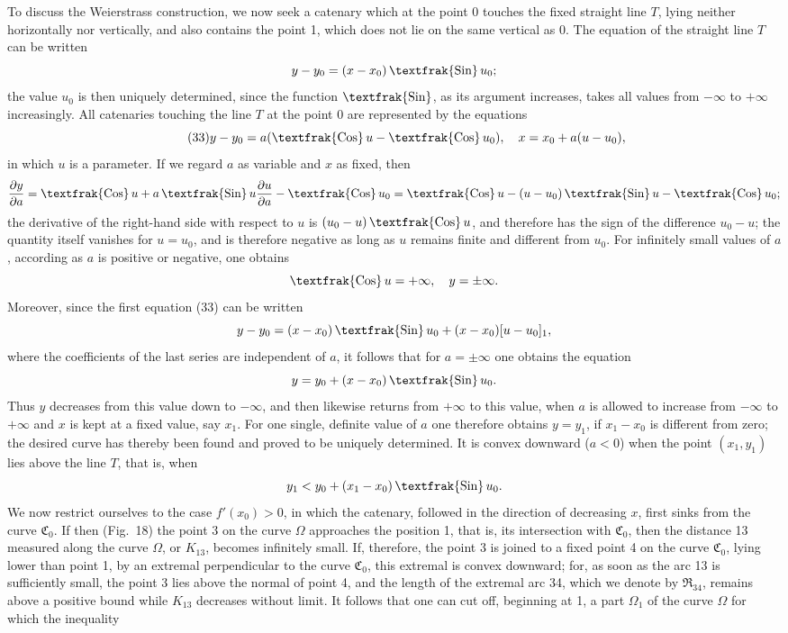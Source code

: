 \documentclass[11pt,a4paper,leqno]{article}
\newcommand{\Cof}{\mathop{\text{\textfrak{Cos}}}\nolimits}
\newcommand{\Sin}{\mathop{\text{\textfrak{Sin}}}\nolimits}
\begin{document}
To discuss the Weierstrass construction, we now seek a catenary which at the point 0 touches the fixed straight line $T$, lying neither horizontally nor vertically, and also contains the point 1, which does not lie on the same vertical as 0. The equation of the straight line $T$ can be written
\[
y-y_0=(x-x_0)\Sin u_0;
\]
the value $u_0$ is then uniquely determined, since the function $\Sin$, as its argument increases, takes all values from $-\infty$ to $+\infty$ increasingly. All catenaries touching the line $T$ at the point 0 are represented by the equations
\begin{equation}\tag{33}
y-y_0=a(\Cof u-\Cof u_0),\quad x=x_0+a(u-u_0),
\end{equation}
in which $u$ is a parameter. If we regard $a$ as variable and $x$ as fixed, then
\[
\frac{\partial y}{\partial a}=\Cof u+a\Sin u\frac{\partial u}{\partial a}-\Cof u_0
=\Cof u-(u-u_0)\Sin u-\Cof u_0;
\]
the derivative of the right-hand side with respect to $u$ is $(u_0-u)\Cof u$, and therefore has the sign of the difference $u_0-u$; the quantity itself vanishes for $u=u_0$, and is therefore negative as long as $u$ remains finite and different from $u_0$. For infinitely small values of $a$, according as $a$ is positive or negative, one obtains
\[
\Cof u=+\infty,\quad y=\pm\infty.
\]
Moreover, since the first equation (33) can be written
\[
y-y_0=(x-x_0)\Sin u_0+(x-x_0)[u-u_0]_1,
\]
where the coefficients of the last series are independent of $a$, it follows that for $a=\pm\infty$ one obtains the equation
\[
y=y_0+(x-x_0)\Sin u_0.
\]
Thus $y$ decreases from this value down to $-\infty$, and then likewise returns from $+\infty$ to this value, when $a$ is allowed to increase from $-\infty$ to $+\infty$ and $x$ is kept at a fixed value, say $x_1$. For one single, definite value of $a$ one therefore obtains $y=y_1$, if $x_1-x_0$ is different from zero; the desired curve has thereby been found and proved to be uniquely determined. It is convex downward ($a<0$) when the point $(x_1,y_1)$ lies above the line $T$, that is, when
\[
y_1<y_0+(x_1-x_0)\Sin u_0.
\]
We now restrict ourselves to the case $f'(x_0)>0$, in which the catenary, followed in the direction of decreasing $x$, first sinks from the curve $\mathfrak{C}_0$. If then (Fig.~18) the point 3 on the curve $\Omega$ approaches the position 1, that is, its intersection with $\mathfrak{C}_0$, then the distance 13 measured along the curve $\Omega$, or $K_{13}$, becomes infinitely small. If, therefore, the point 3 is joined to a fixed point 4 on the curve $\mathfrak{C}_0$, lying lower than point 1, by an extremal perpendicular to the curve $\mathfrak{C}_0$, this extremal is convex downward; for, as soon as the arc 13 is sufficiently small, the point 3 lies above the normal of point 4, and the length of the extremal arc 34, which we denote by $\mathfrak{R}_{34}$, remains above a positive bound while $K_{13}$ decreases without limit. It follows that one can cut off, beginning at 1, a part $\Omega_1$ of the curve $\Omega$ for which the inequality
\end{document}

